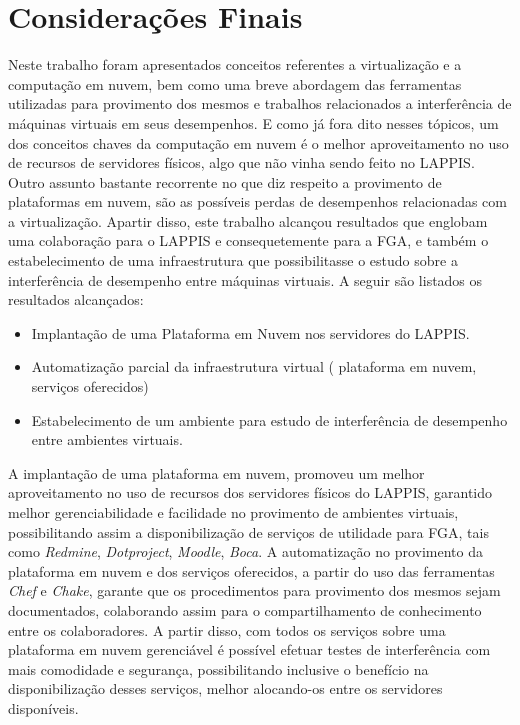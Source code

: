 \chapter{Considerações Finais}
\label{cap:consideracoes_finais}


Neste trabalho foram apresentados conceitos referentes a virtualização e a computação em nuvem, bem como uma breve abordagem das ferramentas utilizadas para provimento dos mesmos e trabalhos relacionados a interferência de máquinas virtuais em seus desempenhos. E como já fora dito nesses tópicos, um dos conceitos chaves da computação em nuvem é o melhor aproveitamento no uso de recursos de servidores físicos, algo que não vinha sendo feito no LAPPIS. Outro assunto bastante recorrente no que diz respeito a provimento de plataformas em nuvem, são as possíveis perdas de desempenhos relacionadas com a virtualização. Apartir disso, este trabalho alcançou resultados que englobam uma colaboração para o LAPPIS e consequetemente para a FGA, e também o estabelecimento de uma infraestrutura que possibilitasse o estudo sobre a interferência de desempenho entre máquinas virtuais. A seguir são listados os resultados alcançados:  

\begin{itemize}
  \item Implantação de uma Plataforma em Nuvem nos servidores do LAPPIS.
  \item Automatização parcial da infraestrutura virtual ( plataforma em nuvem, serviços oferecidos)
  \item Estabelecimento de um ambiente para estudo de interferência de desempenho entre ambientes virtuais.
\end{itemize}

A implantação de uma plataforma em nuvem, promoveu um melhor aproveitamento no uso de recursos dos servidores físicos do LAPPIS, garantido melhor gerenciabilidade e facilidade no provimento de ambientes virtuais, possibilitando assim a disponibilização de serviços de utilidade para FGA, tais como \textit{Redmine}, \textit{Dotproject}, \textit{Moodle}, \textit{Boca}. A automatização no provimento da plataforma em nuvem e dos serviços oferecidos, a partir do uso das ferramentas \textit{Chef} e \textit{Chake}, garante que os procedimentos para provimento dos mesmos sejam documentados, colaborando assim para o compartilhamento de conhecimento entre os colaboradores. A partir disso, com todos os serviços sobre uma plataforma em nuvem gerenciável é possível efetuar testes de interferência com mais comodidade e segurança, possibilitando inclusive o benefício na disponibilização desses serviços, melhor alocando-os entre os servidores disponíveis.

